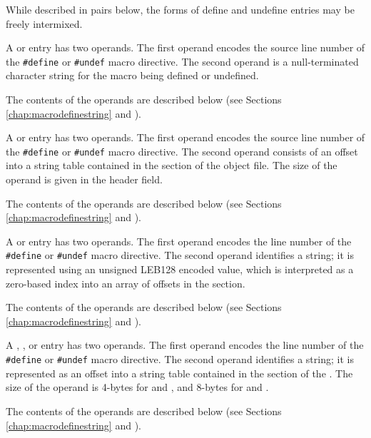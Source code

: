 While described in pairs below, the forms of define 
and undefine entries may be freely intermixed.

\begin{enumerate}[1. ]

\itembfnl{\DWMACROdefineTARG{}, \DWMACROundefTARG{}}
A \DWMACROdefineNAME{} or \DWMACROundefNAME{} entry has two
operands. The first operand encodes the source line number 
of the \texttt{\#define} or \texttt{\#undef} macro directive.
The second operand is a null-terminated character
string for the macro being defined or undefined. 

The contents of the operands are described below (see Sections 
\ref{chap:macrodefinestring} and ).

\itembfnl{\DWMACROdefinestrpTARG{}, \DWMACROundefstrpTARG{}}
A \DWMACROdefinestrpNAME{} or \DWMACROundefstrpNAME{} 
entry has two operands.  The first operand encodes the source line number
of the \texttt{\#define} or \texttt{\#undef} macro directive. 
The second operand consists of an offset into a string table contained in
the \dotdebugstr{} section of the object file.  The size of the operand is
given in the header \HFNoffsetsizeflag{} field. 

The contents of the operands are described below (see Sections 
\ref{chap:macrodefinestring} and ).

\itembfnl{\DWMACROdefinestrxTARG{}, \DWMACROundefstrxTARG{}}
A \DWMACROdefinestrxNAME{} or \DWMACROundefstrxNAME{} entry 
has two operands.  The first operand encodes the line number 
of the \texttt{\#define} or \texttt{\#undef} macro directive.
The second operand identifies a string; it is represented using an 
unsigned LEB128 encoded value,
which is interpreted as a zero-based index into an array of offsets in the
\dotdebugstroffsets{} section. 

The contents of the operands are described below (see Sections 
\ref{chap:macrodefinestring} and ).

\itembfnl{\bb \DWMACROdefinesupfourTARG{}, \DWMACROdefinesupeightTARG{},
\DWMACROundefsupfourTARG{}, \DWMACROundefsupeightTARG
\eb}
\bb
A \DWMACROdefinesupfourNAME{}, \DWMACROdefinesupeightNAME{}, 
\DWMACROundefsupfourNAME{} or \DWMACROundefsupeightNAME{}
\eb
entry has two operands.  The first operand encodes the line number 
of the \texttt{\#define} or \texttt{\#undef} macro directive.
The second operand identifies a string; it is represented as
an offset into a string table contained in the \dotdebugstr{} 
section of the .  
The size of the operand 
\bb
is 4-bytes for \DWMACROdefinesupfourNAME{} and \DWMACROundefsupfourNAME, and
8-bytes for \DWMACROdefinesupeightNAME{} and \DWMACROundefsupeightNAME.
\eb  

The contents of the operands are described below (see Sections 
\ref{chap:macrodefinestring} and ).

\end{enumerate}

